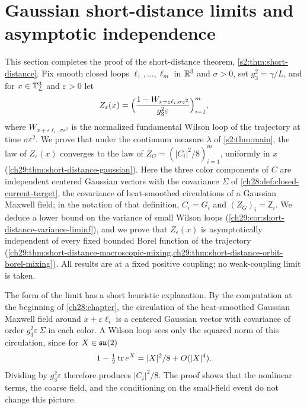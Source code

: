 \chapter{Gaussian short-distance limits and asymptotic independence}\label{ch29:chapter}

This section completes the proof of the short-distance theorem, \cref{s2:thm:short-distance}. Fix smooth closed loops $\ell_1,\dots,\ell_m$ in $\mathbb R^3$ and $\sigma>0$, set $g_3^2=\gamma/L$, and for $x\in\mathbb T_L^3$ and $\varepsilon>0$ let
\[
 Z_\varepsilon(x)=\Bigl(\frac{1-W_{x+\varepsilon\ell_i,\sigma\varepsilon^2}}{g_3^2\varepsilon}\Bigr)_{i=1}^m,
\]
where $W_{x+\varepsilon\ell_i,\sigma\varepsilon^2}$ is the normalized fundamental Wilson loop of the trajectory at time $\sigma\varepsilon^2$. We prove that under the continuum measure $\lambda$ of \cref{s2:thm:main}, the law of $Z_\varepsilon(x)$ converges to the law of $Z_G=(|C_i|^2/8)_{i=1}^m$, uniformly in $x$ (\cref{ch29:thm:short-distance-gaussian}). Here the three color components of $C$ are independent centered Gaussian vectors with the covariance $\Sigma$ of \cref{ch28:def:closed-current-target}, the covariance of heat-smoothed circulations of a Gaussian Maxwell field; in the notation of that definition, $C_i=G_i$ and $(Z_G)_i=\mathsf Z_i$. We deduce a lower bound on the variance of small Wilson loops (\cref{ch29:cor:short-distance-variance-liminf}), and we prove that $Z_\varepsilon(x)$ is asymptotically independent of every fixed bounded Borel function of the trajectory (\cref{ch29:thm:short-distance-macroscopic-mixing,ch29:thm:short-distance-orbit-borel-mixing}). All results are at a fixed positive coupling; no weak-coupling limit is taken.

The form of the limit has a short heuristic explanation. By the computation at the beginning of \cref{ch28:chapter}, the circulation of the heat-smoothed Gaussian Maxwell field around $x+\varepsilon\ell_i$ is a centered Gaussian vector with covariance of order $g_3^2\varepsilon\,\Sigma$ in each color. A Wilson loop sees only the squared norm of this circulation, since for $X\in\mathfrak{su}(2)$
\[
 1-\tfrac12\operatorname{tr} e^X=|X|^2/8+O(|X|^4).
\]
Dividing by $g_3^2\varepsilon$ therefore produces $|C_i|^2/8$. The proof shows that the nonlinear terms, the coarse field, and the conditioning on the small-field event do not change this picture.

